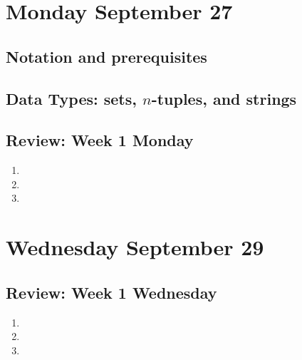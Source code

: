 \documentclass[12pt, oneside]{article}
\begin{document}
\section*{Monday September 27}
\subsection*{Notation and prerequisites}

\subsection*{Data Types: sets, $n$-tuples, and strings}




%

\newpage
\subsection*{Review: Week 1 Monday}
\begin{enumerate}
    \item {}
    \item {}
    \item {}
\end{enumerate}
\newpage
\section*{Wednesday September 29}




\newpage
\subsection*{Review: Week 1 Wednesday}
\begin{enumerate}
    \item {}
    \item {}
    \item {}
\end{enumerate}
\newpage
\end{document}

